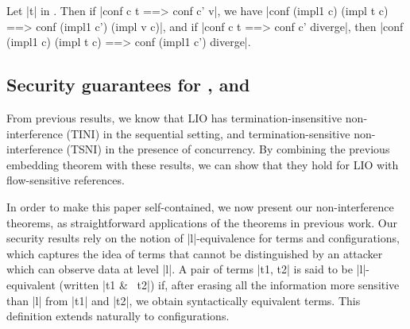 


\begin{theorem}\label{thm:eq} Let |t| in \liofs{}.
  Then if |conf c t ==> conf c' v|, we have |conf (impl1 c) (impl t c)
  ==> conf (impl1 c') (impl v c)|, and if 
  |conf c t ==> conf c' diverge|, then
  |conf (impl1 c) (impl t c) ==> conf (impl1 c') diverge|.
\end{theorem}

\subsection{Security guarantees for \liofs{}, \lioafs{} and \lioconc{}}

From previous results, we know that LIO has termination-insensitive
non-interference (TINI) in the sequential setting, and termination-sensitive
non-interference (TSNI) in the presence of concurrency. By combining the previous
embedding theorem with these results, we can show that they hold for LIO with
flow-sensitive references.

In order to make this paper self-contained, we now present our
non-interference theorems, as straightforward applications of the theorems in
previous work. Our security results rely on the notion of
|l|-equivalence for terms and configurations, which captures the idea
of terms that cannot be distinguished by an attacker which can observe
data at level |l|. A pair of terms |t1, t2| is said to be
|l|-equivalent (written |t1 &~ t2|) if, after erasing all the
information more sensitive than |l| from |t1| and |t2|, we obtain
syntactically equivalent terms. This definition extends naturally to
configurations.

